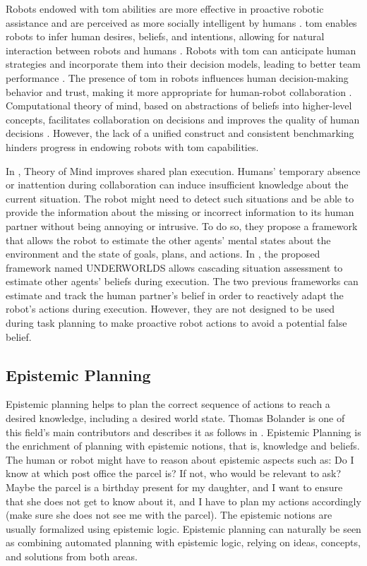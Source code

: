     Robots endowed with \acrshort{tom} abilities are more effective in proactive robotic assistance and are perceived as more socially intelligent by humans \cite{shvo_proactive_2022}. \acrshort{tom} enables robots to infer human desires, beliefs, and intentions, allowing for natural interaction between robots and humans \cite{yu_robot_2023}. Robots with \acrshort{tom} can anticipate human strategies and incorporate them into their decision models, leading to better team performance \cite{romeo_exploring_2022}. The presence of \acrshort{tom} in robots influences human decision-making behavior and trust, making it more appropriate for human-robot collaboration \cite{schlobach_abstracting_2022}. Computational theory of mind, based on abstractions of beliefs into higher-level concepts, facilitates collaboration on decisions and improves the quality of human decisions \cite{gurney_robots_2022}. However, the lack of a unified construct and consistent benchmarking hinders progress in endowing robots with \acrshort{tom} capabilities.

    In \cite{devin_implemented_2016}, Theory of Mind improves shared plan execution. 
    Humans' temporary absence or inattention during collaboration can induce insufficient knowledge about the current situation. The robot might need to detect such situations and be able to provide the information about the missing or incorrect information to its human partner without being annoying or intrusive. To do so, they propose a framework that allows the robot to estimate the other agents' mental states about the environment and the state of goals, plans, and actions. 
    In \cite{lemaignan_underworlds_2018}, the proposed framework named UNDERWORLDS allows cascading situation assessment to estimate other agents' beliefs during execution. The two previous frameworks can estimate and track the human partner's belief in order to reactively adapt the robot's actions during execution. However, they are not designed to be used during task planning to make proactive robot actions to avoid a potential false belief.


    \subsection{Epistemic Planning}
    Epistemic planning helps to plan the correct sequence of actions to reach a desired knowledge, including a desired world state. Thomas Bolander is one of this field's main contributors and describes it as follows in \cite{bolander_gentle_2017}. Epistemic Planning is the enrichment of planning with epistemic notions, that is, knowledge and beliefs. The human or robot might have to reason about epistemic aspects such as: Do I know at which post office the parcel is? If not, who would be relevant to ask? Maybe the parcel is a birthday present for my daughter, and I want to ensure that she does not get to know about it, and I have to plan my actions accordingly (make sure she does not see me with the parcel). The epistemic notions are usually formalized using epistemic logic. Epistemic planning can naturally be seen as combining automated planning with epistemic logic, relying on ideas, concepts, and solutions from both areas. 

